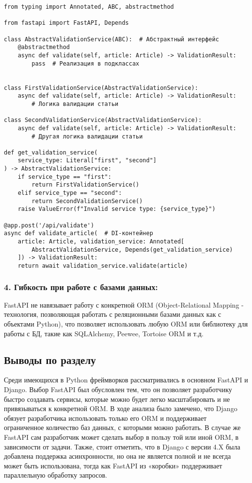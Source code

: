 \begin{verbatim}
from typing import Annotated, ABC, abstractmethod

from fastapi import FastAPI, Depends

class AbstractValidationService(ABC):  # Абстрактный интерфейс
    @abstractmethod
    async def validate(self, article: Article) -> ValidationResult:
        pass  # Реализация в подклассах


class FirstValidationService(AbstractValidationService):
    async def validate(self, article: Article) -> ValidationResult:
        # Логика валидации статьи

class SecondValidationService(AbstractValidationService):
    async def validate(self, article: Article) -> ValidationResult:
        # Другая логика валидации статьи

def get_validation_service(
    service_type: Literal["first", "second"]
) -> AbstractValidationService:
    if service_type == "first":
        return FirstValidationService()
    elif service_type == "second":
        return SecondValidationService()
    raise ValueError(f"Invalid service type: {service_type}")

@app.post('/api/validate')
async def validate_article(  # DI-контейнер
    article: Article, validation_service: Annotated[
        AbstractValidationService, Depends(get_validation_service)  
    ]) -> ValidationResult:
    return await validation_service.validate(article)
\end{verbatim}

\subsubsection*{4. Гибкость при работе с базами данных:}
FastAPI не навязывает работу с конкретной ORM 
(Object-Relational Mapping - технология, позволяющая работать с реляционными базами данных как с объектами Python),
что позволяет использовать любую ORM или библиотеку для работы с БД, такие как SQLAlchemy, Peewee, Tortoise ORM и т.д.

\subsection{Выводы по разделу}
Среди имеющихся в Python фреймворков рассматривались в основном FastAPI
и Django. Выбор FastAPI был обусловлен тем, что он позволяет разработчику быстро создавать
сервисы, которые можно будет легко масштабировать и не привязываться к конкретной
ORM. В ходе анализа было замечено, что Django обязует разработчика использовать только
его ORM и поддерживает ограниченное количество баз данных, с которыми можно работать.
В случае же FastAPI сам разработчик может сделать выбор в пользу той или иной ORM, в
зависимости от задачи. Также, стоит отметить, что в Django с версии 4.X была добавлена
поддержка асинхронности, но она не является полной и не всегда может быть использована,
тогда как FastAPI из «коробки» поддерживает параллельную обработку запросов. \cite{fastapi-best-practices,fastapi-bill}
			

